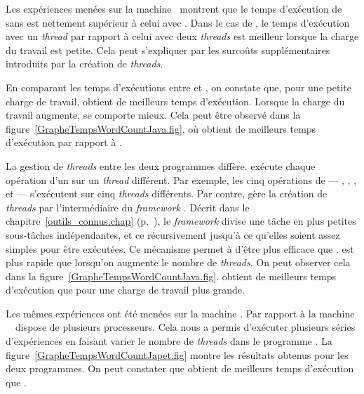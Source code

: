 
Les exp\'eriences men\'ees sur la machine \ montrent que le temps d'ex\'ecution de  sans  est nettement sup\'erieur \`a celui avec . Dans le cas de , le temps d'ex\'ecution avec un \emph{thread} par rapport \`a celui avec deux \emph{threads} est meilleur lorsque la charge du travail est petite. Cela peut s'expliquer par les surco\^uts suppl\'ementaires introduits par la cr\'eation de \emph{threads}.

En comparant les temps d'ex\'ecutions entre  et , on constate que, pour une petite charge de travail,  obtient de meilleurs temps d'ex\'ecution. Lorsque la charge du travail augmente,  se comporte mieux. Cela peut \^etre observ\'e dans la figure~\ref{GrapheTempsWordCountJava.fig}, o\`u  obtient de meilleurs temps d'ex\'ecution par rapport \`a . 

La gestion de \emph{threads} entre les deux programmes diff\`ere.  ex\'ecute chaque op\'eration d'un  sur un \emph{thread} diff\'erent. Par exemple, les cinq op\'erations de  --- , , ,  et  --- s'ex\'ecutent sur cinq \emph{threads} diff\'erents. Par contre,  g\`ere la cr\'eation de \emph{threads} par l'interm\'ediaire du \emph{framework} . D\'ecrit dans le chapitre~\ref{outils_connus.chap} (p.~\pageref{forkjoin.sect}), le \emph{framework} divise une t\^ache en plus petites sous-t\^aches ind\'ependantes, et ce r\'ecursivement jusqu'\`a ce qu'elles soient assez simples pour \^etre ex\'ecut\'ees. Ce m\'ecanisme permet \`a  d'\^etre plus efficace que .  est plus rapide que  lorsqu'on augmente le nombre de \emph{threads}. On peut observer cela dans la figure~\ref{GrapheTempsWordCountJava.fig}.  obtient de meilleurs temps d'ex\'ecution que  pour une charge de travail plus grande.

Les m\^emes exp\'eriences ont \'et\'e men\'ees sur la machine . Par rapport \`a la machine \, \ dispose de plusieurs processeurs. Cela nous a permis d'ex\'ecuter plusieurs s\'eries d'exp\'eriences en faisant varier le nombre de \emph{threads} dans le programme . La figure~\ref{GrapheTempsWordCountJapet.fig} montre les r\'esultats obtenus pour les deux programmes. On peut constater que  obtient de meilleurs temps d'ex\'ecution  que . 



